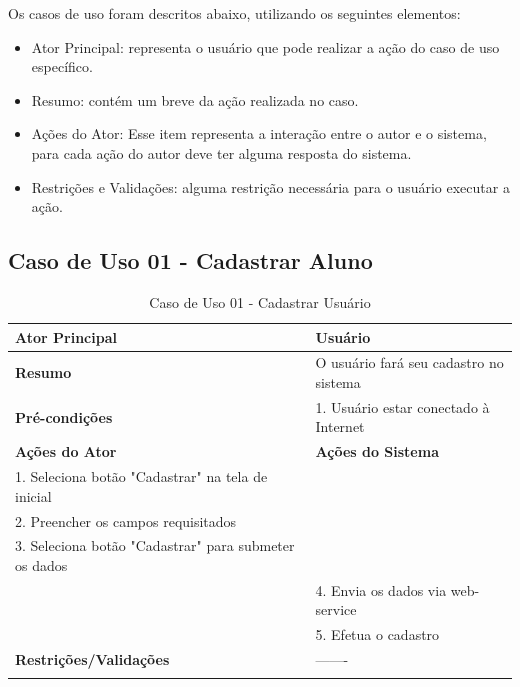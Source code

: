 Os casos de uso foram descritos abaixo, utilizando os seguintes elementos:

\begin{itemize}
\item Ator Principal: representa o usuário que pode realizar a ação do caso de uso específico.
\item Resumo: contém um breve da ação realizada no caso.
\item Ações do Ator: Esse item representa a interação entre o autor e o sistema, para cada ação do autor deve ter alguma resposta do sistema.
\item Restrições e Validações: alguma restrição necessária para o usuário executar a ação.
\end{itemize}


\subsection{Caso de Uso 01 - Cadastrar Aluno}
\label{sc:case1}
\begin{center}
\begin{longtable}{p{8cm}|p{8cm}}
    \hline
    \textbf{Ator Principal} & Usu\'{a}rio \\
    \hline
    \textbf{Resumo} & O usuário fará seu cadastro no sistema \\
    \hline
    \textbf{Pr\'{e}-condi\c{c}\~{o}es} & 1. Usuário estar conectado à Internet\\
    \hline
    \textbf{A\c{c}\~{o}es do Ator} & \textbf{A\c{c}\~{o}es do Sistema} \\
    
    \hline
    1. Seleciona botão "Cadastrar" na tela de inicial & \\
    \hline
    2. Preencher os campos requisitados & \\
    \hline
    3. Seleciona botão "Cadastrar" para submeter os dados & \\
    \hline
    & 4. Envia os dados via web-service \\
    \hline
    & 5. Efetua o cadastro \\
    \hline
    \hline
    \textbf{Restri\c{c}\~{o}es/Valida\c{c}\~{o}es} & -------\\
\hline
\caption{Caso de Uso 01 - Cadastrar Usu\'{a}rio}
\end{longtable}
\end{center}

